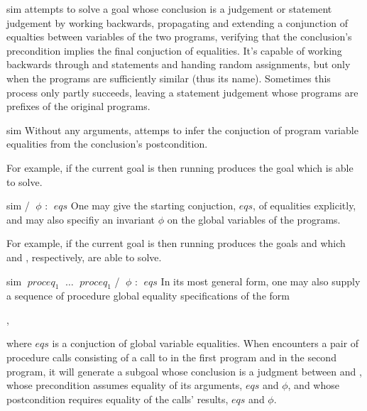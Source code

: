 \begin{tactic}{sim}
   attempts to solve a goal whose conclusion is a \prhl
  judgement or statement judgement by working backwards, propagating
  and extending a conjunction of equalties between variables of the
  two programs, verifying that the conclusion's precondition implies
  the final conjuction of equalities.  It's capable of working
  backwards through  and  statements and handing
  random assignments, but only when the programs are sufficiently
  similar (thus its name). Sometimes this process only partly
  succeeds, leaving a statement judgement whose programs are prefixes
  of the original programs.

  \begin{tsyntax}{sim}
    Without any arguments,  attemps to infer the conjuction of
    program variable equalities from the conclusion's postcondition.

    \medskip For example, if the current goal is
     then
    running 
    produces the goal
    which  is able to solve.
  \end{tsyntax}

  \begin{tsyntax}{sim / $\;\phi$ : $\;\mathit{eqs}$}
    One may give the starting conjuction, $\mathit{eqs}$, of equalities
    explicitly, and may also specifiy an invariant $\phi$ on the
    global variables of the programs.

    \medskip For example, if the current goal is
     then
    running 
    produces the goals
    and
    which  and , respectively, are
    able to solve.
  \end{tsyntax}

  \begin{tsyntax}{sim $\;\mathit{proceq}_1$ $\;\ldots$ $\;\mathit{proceq}_1$ / $\;\phi$ : $\;\mathit{eqs}$}
    In its most general form, one may also supply a sequence of
    procedure global equality specifications of the form
    \begin{center}
      ,
    \end{center}
    where $\mathit{eqs}$ is a conjuction of global variable
    equalities. When  encounters a pair of procedure calls
    consisting of a call to  in the first program and
     in the second program, it will generate a subgoal
    whose conclusion is a \prhl judgment between  and
    , whose precondition assumes equality of its
    arguments, $\mathit{eqs}$ and $\phi$, and whose postcondition
    requires equality of the calls' results, $\mathit{eqs}$ and
    $\phi$.


\end{tsyntax}
\end{tactic}
